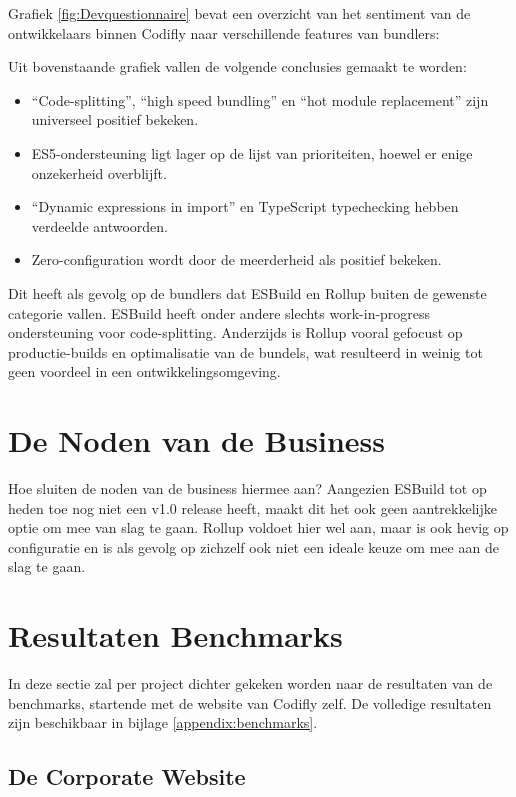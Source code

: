 Grafiek \ref{fig:Devquestionnaire} bevat een overzicht van het sentiment van de ontwikkelaars binnen Codifly naar verschillende features van bundlers:

Uit bovenstaande grafiek vallen de volgende conclusies gemaakt te worden:

\begin{itemize}
    \item ``Code-splitting'', ``high speed bundling'' en ``hot module replacement'' zijn universeel positief bekeken.
    \item ES5-ondersteuning ligt lager op de lijst van prioriteiten, hoewel er enige onzekerheid overblijft.
    \item ``Dynamic expressions in import'' en TypeScript typechecking hebben verdeelde antwoorden.
    \item Zero-configuration wordt door de meerderheid als positief bekeken.
\end{itemize}

Dit heeft als gevolg op de bundlers dat ESBuild en Rollup buiten de gewenste categorie vallen. ESBuild heeft onder andere slechts work-in-progress ondersteuning voor code-splitting. Anderzijds is Rollup vooral gefocust op productie-builds en optimalisatie van de bundels, wat resulteerd in weinig tot geen voordeel in een ontwikkelingsomgeving.

\section{De Noden van de Business}

Hoe sluiten de noden van de business hiermee aan? Aangezien ESBuild tot op heden toe nog niet een v1.0 release heeft, maakt dit het ook geen aantrekkelijke optie om mee van slag te gaan. Rollup voldoet hier wel aan, maar is ook hevig op configuratie en is als gevolg op zichzelf ook niet een ideale keuze om mee aan de slag te gaan.

\section{Resultaten Benchmarks}

In deze sectie zal per project dichter gekeken worden naar de resultaten van de benchmarks, startende met de website van Codifly zelf. De volledige resultaten zijn beschikbaar in bijlage \ref{appendix:benchmarks}.

\subsection{De Corporate Website}


